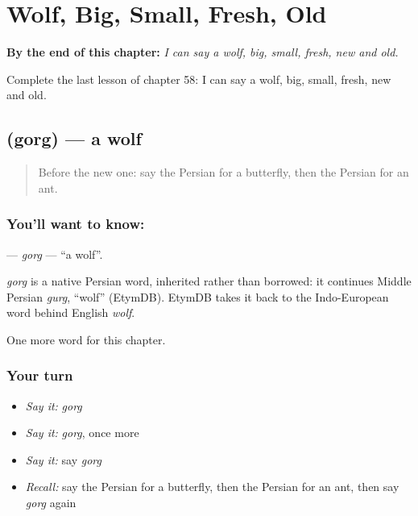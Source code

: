 
\chapter{Wolf, Big, Small, Fresh, Old}
\label{ch:fa-wolf-big-small-fresh-old}

\begin{chapteropening}
\textbf{By the end of this chapter:} \emph{I can say a wolf, big, small, fresh, new and old.}

Complete the last lesson of chapter 58: I can say a wolf, big, small, fresh, new and old.
\end{chapteropening}

\section[\texorpdfstring{\fa{گرگ} (gorg)}{گرگ (gorg)}]{ (gorg) — a wolf}

\label{lesson:FA-C58-gorg}



\begin{quote}
Before the new one: say the Persian for a butterfly, then the Persian for an ant.
\end{quote}

\subsection*{You'll want to know: }
\textbf{} — \emph{gorg} — \textquotedblleft{}a wolf\textquotedblright{}.

\begin{cousinweb}
\emph{gorg} is a native Persian word, inherited rather than borrowed: it continues Middle Persian \emph{gurg}, \textquotedblleft{}wolf\textquotedblright{} (EtymDB). EtymDB takes it back to the Indo-European word behind English \emph{wolf}.
\end{cousinweb}

\begin{grammarlens}[title={What you've built}]
One more word for this chapter.
\end{grammarlens}

\subsection*{Your turn}
\begin{itemize}
\raggedright
  \item \emph{Say it:} \emph{gorg}
  \item \emph{Say it:} \emph{gorg}, once more
  \item \emph{Say it:} say \emph{gorg}
  \item \emph{Recall:} say the Persian for a butterfly, then the Persian for an ant, then say \emph{gorg} again
\end{itemize}

